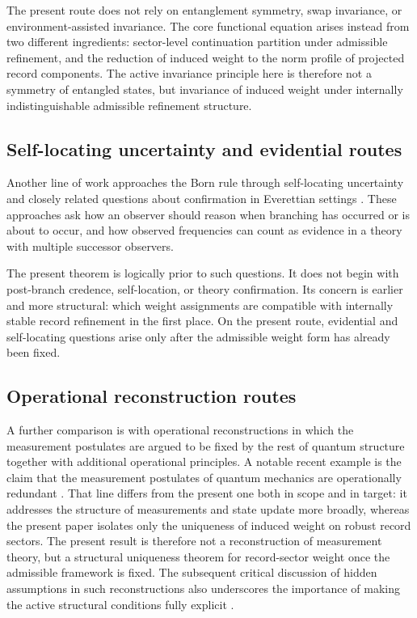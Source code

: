 \documentclass[11pt]{article}
\theoremstyle{remark}
\numberwithin{equation}{section}
\begin{document}
The present route does not rely on entanglement symmetry, swap invariance, or environment-assisted invariance. The core functional equation arises instead from two different ingredients: sector-level continuation partition under admissible refinement, and the reduction of induced weight to the norm profile of projected record components. The active invariance principle here is therefore not a symmetry of entangled states, but invariance of induced weight under internally indistinguishable admissible refinement structure.

\subsection{Self-locating uncertainty and evidential routes}

Another line of work approaches the Born rule through self-locating uncertainty and closely related questions about confirmation in Everettian settings \cite{SebensCarroll2014,GreavesMyrvold2010}. These approaches ask how an observer should reason when branching has occurred or is about to occur, and how observed frequencies can count as evidence in a theory with multiple successor observers.

The present theorem is logically prior to such questions. It does not begin with post-branch credence, self-location, or theory confirmation. Its concern is earlier and more structural: which weight assignments are compatible with internally stable record refinement in the first place. On the present route, evidential and self-locating questions arise only after the admissible weight form has already been fixed.

\subsection{Operational reconstruction routes}

A further comparison is with operational reconstructions in which the measurement postulates are argued to be fixed by the rest of quantum structure together with additional operational principles. A notable recent example is the claim that the measurement postulates of quantum mechanics are operationally redundant \cite{MasanesGalleyMuller2019}. That line differs from the present one both in scope and in target: it addresses the structure of measurements and state update more broadly, whereas the present paper isolates only the uniqueness of induced weight on robust record sectors. The present result is therefore not a reconstruction of measurement theory, but a structural uniqueness theorem for record-sector weight once the admissible framework is fixed. The subsequent critical discussion of hidden assumptions in such reconstructions also underscores the importance of making the active structural conditions fully explicit \cite{Stacey2022}.
\end{document}
